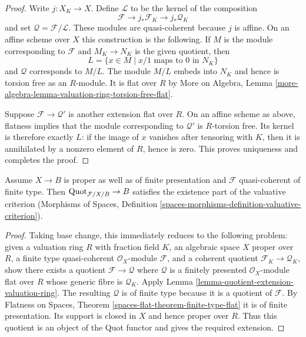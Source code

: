 \begin{proof}
Write $j : X_K \to X$. Define $\mathcal{L}$ to be the kernel of the
composition
$$
\mathcal{F} \longrightarrow j_*\mathcal{F}_K
\longrightarrow j_*\mathcal{Q}_K
$$
and set $\mathcal{Q} = \mathcal{F}/\mathcal{L}$. These modules are
quasi-coherent because $j$ is affine. On an affine scheme over $X$ this
construction is the following. If $M$ is the module corresponding to
$\mathcal{F}$ and $M_K \to N_K$ is the given quotient, then
$$
L = \{x \in M \mid x/1 \text{ maps to }0\text{ in }N_K\}
$$
and $\mathcal{Q}$ corresponds to $M/L$. The module $M/L$ embeds into
$N_K$ and hence is torsion free as an $R$-module. It is flat over $R$ by
More on Algebra, Lemma
\ref{more-algebra-lemma-valuation-ring-torsion-free-flat}.

Suppose $\mathcal{F} \to \mathcal{Q}'$ is another extension flat over
$R$. On an affine scheme as above, flatness implies that the module
corresponding to $\mathcal{Q}'$ is $R$-torsion free. Its kernel is
therefore exactly $L$: if the image of $x$ vanishes after tensoring with
$K$, then it is annihilated by a nonzero element of $R$, hence is zero.
This proves uniqueness and completes the proof.
\end{proof}

\begin{lemma}
\label{lemma-quot-existence-part}
Assume $X \to B$ is proper as well as of finite presentation
and $\mathcal{F}$ quasi-coherent of finite type.
Then $\mathrm{Quot}_{\mathcal{F}/X/B} \to B$ satisfies the existence part
of the valuative criterion (Morphisms of Spaces, Definition
\ref{spaces-morphisms-definition-valuative-criterion}).
\end{lemma}

\begin{proof}
Taking base change, this immediately reduces to the following
problem: given a valuation ring $R$ with fraction field $K$,
an algebraic space $X$ proper over $R$, a finite type quasi-coherent
$\mathcal{O}_X$-module $\mathcal{F}$, and a coherent
quotient $\mathcal{F}_K \to \mathcal{Q}_K$, show there exists
a quotient $\mathcal{F} \to \mathcal{Q}$ where $\mathcal{Q}$ is a
finitely presented $\mathcal{O}_X$-module
flat over $R$ whose generic fibre is $\mathcal{Q}_K$.
Apply Lemma \ref{lemma-quotient-extension-valuation-ring}. The resulting
$\mathcal{Q}$ is of finite type because it is a quotient of $\mathcal{F}$.
By Flatness on Spaces, Theorem
\ref{spaces-flat-theorem-finite-type-flat}
it is of finite presentation. Its support is closed in $X$ and hence
proper over $R$. Thus this quotient is an object of the Quot functor
and gives the required extension.
\end{proof}

